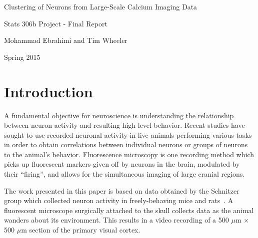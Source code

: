 \documentclass[10pt]{article}
\newcommand{\calcium}[0]{Ca\textsuperscript{2+}}
\begin{document}
\begin{center}
    {\LARGE Clustering of Neurons from Large-Scale Calcium Imaging Data}

    Stats 306b Project - Final Report

    Mohammad Ebrahimi and Tim Wheeler

    Spring 2015
\end{center}

\begin{abstract}
Fluorescent imaging allows for the analysis of signalling behavior on a per-neuron basis in anesthetized and awake behaving animals. %
Existing methods monitor {\calcium} dynamics over a large region, but recently developed automated methods allow for isolating signals and associating them with particular neurons.
The resulting set of candidate neurons suffers from the presence of background structures such as blood vessels.
This project applies clustering methods to candidate objects in a one-photon {\calcium} dataset for the classification of neurons from background structures.
Hierarchical clustering was performed to identify preliminary classes, resulting in several neuronal clusters which likely correspond to various layers in the brain.
Principle component analysis was performed to identify preliminary important features and identify a reduced featureset which captures the majority of the variation in the data.
Group validation was performed by comparing the clusters obtained in the first dataset to the clusters obtained in a withheld dataset.
\end{abstract}


\section{Introduction}

A fundamental objective for neuroscience is understanding the relationship between neuron activity and resulting high level behavior.
Recent studies have sought to use recorded neuronal activity in live animals performing various tasks in order to obtain correlations between individual neurons or groups of neurons to the animal's behavior. Fluorescence microscopy is one recording method which picks up fluorescent markers given off by neurons in the brain, modulated by their ``firing'', and allows for the simultaneous imaging of large cranial regions.

The work presented in this paper is based on data obtained by the Schnitzer group which collected neuron activity in freely-behaving mice and rats~\cite{Ghosh2011}. 
A fluorescent microscope surgically attached to the skull collects data as the animal wanders about its environment.
This results in a video recording of a \num{500} $\mu$m $\times$ \num{500} $\mu$m section of the primary visual cortex.
\end{document}

